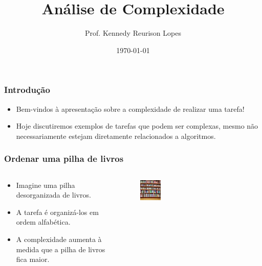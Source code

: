 \documentclass[12pt]{beamer}
\title{Análise de Complexidade}
\author{Prof. Kennedy Reurison Lopes}
\date{\today}
\begin{document}
\frame{\titlepage}

\begin{frame}
    \frametitle{Introdução}

    \begin{itemize}
        \item Bem-vindos à apresentação sobre a complexidade de realizar uma tarefa!
        \item Hoje discutiremos exemplos de tarefas que podem ser complexas, mesmo não necessariamente estejam diretamente relacionados a algoritmos.
    \end{itemize}
\end{frame}

\begin{frame}
    \frametitle{Ordenar uma pilha de livros}
    \begin{columns}[T] %
        \begin{column}{0.5\textwidth}
            \begin{itemize}
                \pause \item Imagine uma pilha desorganizada de livros.
                \pause \item A tarefa é organizá-los em ordem alfabética.
                \pause \item A complexidade aumenta à medida que a pilha de livros fica maior.
            \end{itemize}
        \end{column}
        \begin{column}{0.4\textwidth}
            \begin{figure}[htb]
                \centering
                \includegraphics[width=0.2\textwidth]{livros.jpg}
                \label{fig:livros}
            \end{figure}
        \end{column}
    \end{columns}
\end{frame}
\end{document}
